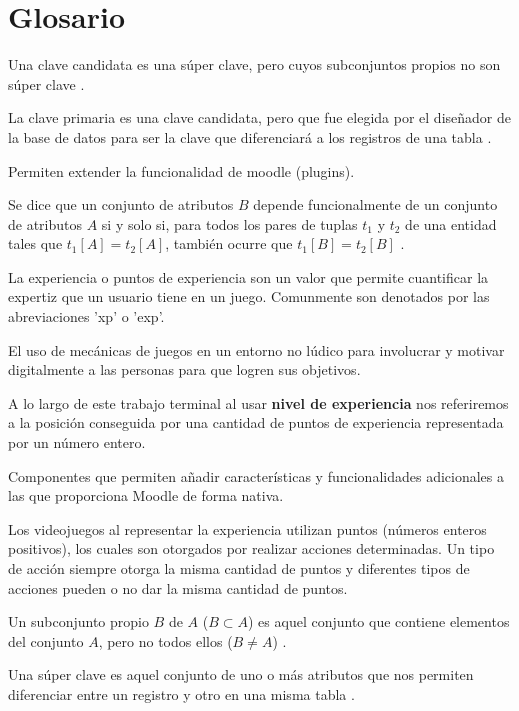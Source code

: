 \chapter{Glosario} \label{ch:glosario}

\begin{bGlosario}

  Una clave candidata es una súper clave, pero cuyos subconjuntos propios no son súper clave \cite[p. 24]{libroBaseDeDatosEspaniol}.


  La clave primaria es una clave candidata, pero que fue elegida por el diseñador de la base de datos para ser la clave que diferenciará a los registros de una tabla \cite[p. 24]{libroBaseDeDatosEspaniol}.

  Permiten extender la funcionalidad de moodle (plugins).

  Se dice que un conjunto de atributos $B$ depende funcionalmente de un conjunto de atributos $A$ si y solo si, para todos los pares de tuplas $t_1$ y $t_2$ de una entidad tales que $t_1[A] = t_2[A]$, también ocurre que  $t_1[B] = t_2[B]$ \cite[p. 163]{libroBaseDeDatosEspaniol}.

  La experiencia o puntos de experiencia son un valor que permite cuantificar la expertiz que un usuario tiene en un juego. Comunmente son denotados por las abreviaciones 'xp' o 'exp'.

  El uso de mecánicas de juegos en un entorno no lúdico para involucrar y motivar digitalmente a las personas para que logren sus objetivos.

  A lo largo de este trabajo terminal al usar \textbf{nivel de experiencia} nos referiremos a la posición conseguida por una cantidad de puntos de experiencia representada por un número entero.

  Componentes que permiten añadir características y funcionalidades adicionales a las que proporciona Moodle de forma nativa.

  Los videojuegos al representar la experiencia utilizan puntos (números enteros positivos), los cuales son otorgados por realizar acciones determinadas. Un tipo de acción siempre otorga la misma cantidad de puntos y diferentes tipos de acciones pueden o no dar la misma cantidad de puntos.

  Un subconjunto propio $B$ de $A$ ($B \subset A$) es aquel conjunto que contiene elementos del conjunto $A$, pero no todos ellos ($B \neq A$) \cite[p. 79]{libroMatematicasDiscretas}.

  Una súper clave es aquel conjunto de uno o más atributos que nos permiten diferenciar entre un registro y otro en una misma tabla \cite[p. 24]{libroBaseDeDatosEspaniol}.


\end{bGlosario}
